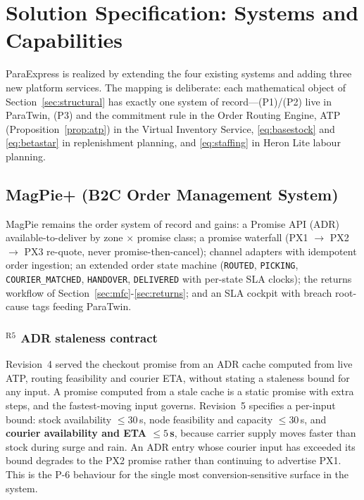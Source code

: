 \section{Solution Specification: Systems and Capabilities}\label{sec:solution}

ParaExpress is realized by extending the four existing systems and adding three new platform services. The mapping is deliberate: each mathematical object of Section~\ref{sec:structural} has exactly one system of record---(P1)/(P2) live in ParaTwin, (P3) and the commitment rule in the Order Routing Engine, ATP (Proposition~\ref{prop:atp}) in the Virtual Inventory Service, \eqref{eq:basestock} and \eqref{eq:betastar} in replenishment planning, and \eqref{eq:staffing} in Heron Lite labour planning.

\subsection{MagPie+ (B2C Order Management System)}
MagPie remains the order system of record and gains: a Promise API (ADR) available-to-deliver by zone $\times$ promise class; a promise waterfall (PX1 $\to$ PX2 $\to$ PX3 re-quote, never promise-then-cancel); channel adapters with idempotent order ingestion; an extended order state machine (\texttt{ROUTED}, \texttt{PICKING}, \texttt{COURIER\_MATCHED}, \texttt{HANDOVER}, \texttt{DELIVERED} with per-state SLA clocks); the returns workflow of Section~\ref{sec:mfc}-\ref{sec:returns}; and an SLA cockpit with breach root-cause tags feeding ParaTwin.

\subsubsection*{$^{\mathrm{R5}}$ ADR staleness contract}
Revision~4 served the checkout promise from an ADR cache computed from live ATP, routing feasibility and courier ETA, without stating a staleness bound for any input. A promise computed from a stale cache is a static promise with extra steps, and the fastest-moving input governs. Revision~5 specifies a per-input bound: stock availability $\le30$\,s, node feasibility and capacity $\le30$\,s, and \textbf{courier availability and ETA $\le5$\,s}, because carrier supply moves faster than stock during surge and rain. An ADR entry whose courier input has exceeded its bound degrades to the PX2 promise rather than continuing to advertise PX1. This is the P-6 behaviour for the single most conversion-sensitive surface in the system.

